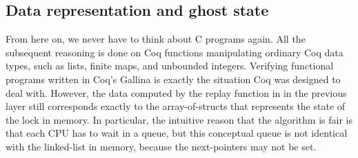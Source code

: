 %
%
%
%
%

\subsection{Data representation and ghost state}
\label{chapter:mcslock:sec:representation-ghost}

From here on, we never have to think about C programs again.  All the
subsequent reasoning is done on Coq functions manipulating ordinary
Coq data types, such as lists, finite maps, and unbounded integers.
Verifying functional programs written in Coq's Gallina is exactly the
situation Coq was designed to deal with. However, the data computed
by the replay function in in the previous layer still corresponds
exactly to the array-of-structs that represents the state of the lock
in memory.
In particular, the intuitive reason that the algorithm is fair is that
each CPU has to wait in a queue, but this conceptual queue is not identical with
the linked-list in memory, because the next-pointers may not be set.

